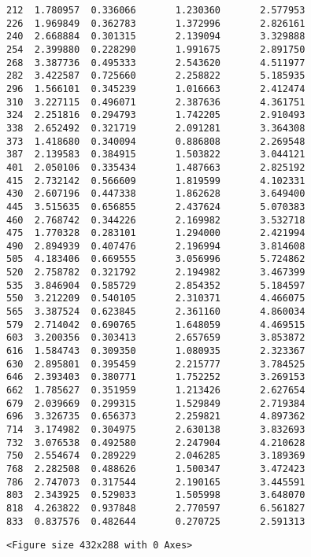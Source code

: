 \documentclass[11pt]{article}
\begin{document}
\begin{Verbatim}[commandchars=\\\{\}]
212  1.780957  0.336066       1.230360       2.577953
226  1.969849  0.362783       1.372996       2.826161
240  2.668884  0.301315       2.139094       3.329888
254  2.399880  0.228290       1.991675       2.891750
268  3.387736  0.495333       2.543620       4.511977
282  3.422587  0.725660       2.258822       5.185935
296  1.566101  0.345239       1.016663       2.412474
310  3.227115  0.496071       2.387636       4.361751
324  2.251816  0.294793       1.742205       2.910493
338  2.652492  0.321719       2.091281       3.364308
373  1.418680  0.340094       0.886808       2.269548
387  2.139583  0.384915       1.503822       3.044121
401  2.050106  0.335434       1.487663       2.825192
415  2.732142  0.566609       1.819599       4.102331
430  2.607196  0.447338       1.862628       3.649400
445  3.515635  0.656855       2.437624       5.070383
460  2.768742  0.344226       2.169982       3.532718
475  1.770328  0.283101       1.294000       2.421994
490  2.894939  0.407476       2.196994       3.814608
505  4.183406  0.669555       3.056996       5.724862
520  2.758782  0.321792       2.194982       3.467399
535  3.846904  0.585729       2.854352       5.184597
550  3.212209  0.540105       2.310371       4.466075
565  3.387524  0.623845       2.361160       4.860034
579  2.714042  0.690765       1.648059       4.469515
603  3.200356  0.303413       2.657659       3.853872
616  1.584743  0.309350       1.080935       2.323367
630  2.895801  0.395459       2.215777       3.784525
646  2.393403  0.380771       1.752252       3.269153
662  1.785627  0.351959       1.213426       2.627654
679  2.039669  0.299315       1.529849       2.719384
696  3.326735  0.656373       2.259821       4.897362
714  3.174982  0.304975       2.630138       3.832693
732  3.076538  0.492580       2.247904       4.210628
750  2.554674  0.289229       2.046285       3.189369
768  2.282508  0.488626       1.500347       3.472423
786  2.747073  0.317544       2.190165       3.445591
803  2.343925  0.529033       1.505998       3.648070
818  4.263822  0.937848       2.770597       6.561827
833  0.837576  0.482644       0.270725       2.591313

    \end{Verbatim}

    
    \begin{verbatim}
<Figure size 432x288 with 0 Axes>
    \end{verbatim}

    
    \begin{center}
    \end{center}
    { \hspace*{\fill} \\}
    
\end{document}
